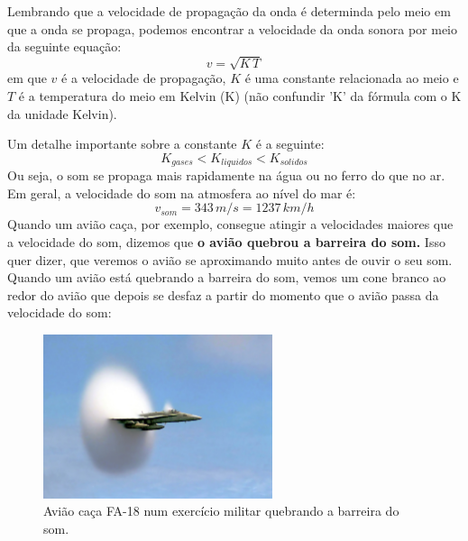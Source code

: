 \documentclass[12pt]{extarticle}
\newcommand{\<}{\langle}
\renewcommand{\>}{\rangle}
\theoremstyle{definition}
\begin{document}
Lembrando que a velocidade de propagação da onda é determinda pelo meio em que a onda se propaga, podemos encontrar a velocidade da onda sonora por meio da seguinte equação:
\begin{equation}
    v=\sqrt{K\,T}
\end{equation}
\noindent em que $v$ é a velocidade de propagação, $K$ é uma constante relacionada ao meio e $T$ é a temperatura do meio em Kelvin (K) (não confundir 'K' da fórmula com o K da unidade Kelvin).

Um detalhe importante sobre a constante $K$ é a seguinte:
\begin{equation}
    K_{gases} < K_{liquidos} < K_{solidos}
\end{equation}
Ou seja, o som se propaga mais rapidamente na água ou no ferro do que no ar. Em geral, a velocidade do som na atmosfera ao nível do mar é:
\begin{equation}
    v_{som} = 343\,m/s = 1237\,km/h
\end{equation}
Quando um avião caça, por exemplo, consegue atingir a velocidades maiores que a velocidade do som, dizemos que \textbf{o avião quebrou a barreira do som.} Isso quer dizer, que veremos o avião se aproximando muito antes de ouvir o seu som. Quando um avião está quebrando a barreira do som, vemos um cone branco ao redor do avião que depois se desfaz a partir do momento que o avião passa da velocidade do som:

\begin{figure}[H]
    \centering
    \includegraphics[width=0.6\textwidth]{FA-18_Hornet_breaking_sound_barrier_(7_July_1999)_-_filtered.jpg}
    \caption{Avião caça FA-18 num exercício militar quebrando a barreira do som.}
    \label{fig:barreira do som}
\end{figure}
\end{document}
